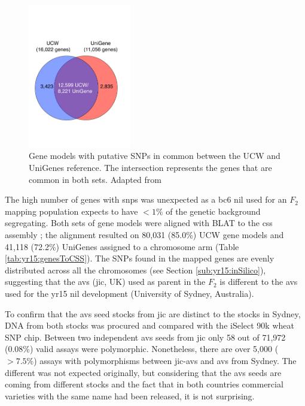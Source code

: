 \begin{figure}
    \includegraphics[width=0.4\textwidth]{Yr15/Figures/geneCounts.pdf} 
    \caption[Gene models with putative SNPs]{Gene models with putative \gls{SNP}s in common between the UCW and UniGenes reference. The intersection represents the genes that are common in both sets. Adapted from \citet{Ramirez-Gonzalez2015b}}
    \label{fig:yr15:geneCount}
\end{figure}



The high number of genes with \gls{snp}s was unexpected as a \gls{bc}6 \gls{nil} used for an $F_2$ mapping population expects to have $<1\%$ of the genetic background segregating. 
Both sets of gene models were aligned with BLAT \citep{Kent2002} to the \gls{css} assembly \citep{Mayer2014}; the alignment resulted on 80,031 (85.0\%) UCW gene models and 41,118 (72.2\%) UniGenes assigned to a chromosome arm (Table \ref{tab:yr15:genesToCSS}). 
The SNPs found in the mapped genes are evenly distributed across all the chromosomes (see Section \ref{sub:yr15:inSilico}), suggesting that the \gls{avs} (\gls{jic}, UK) used as parent in the $F_{2}$ is different to the \gls{avs} used for the \acrshort{yr15} \acrshort{nil} development (University of Sydney, Australia).  

To confirm that the \gls{avs} seed stocks from \gls{jic} are distinct to the stocks in Sydney, DNA from both stocks was procured and compared with the iSelect 90k wheat SNP chip. 
Between two independent \gls{avs} seeds from \gls{jic} only 58 out of 71,972 (0.08\%) valid assays were polymorphic. 
Nonetheless, there are over 5,000 ($>7.5\%$) assays with polymorphisms between  \gls{jic}-\gls{avs} and \gls{avs} from Sydney. 
The different was not expected originally, but considering that the \gls{avs} seeds are coming from different stocks and the fact that in both countries commercial varieties with the same name had been released, it is not surprising. 


